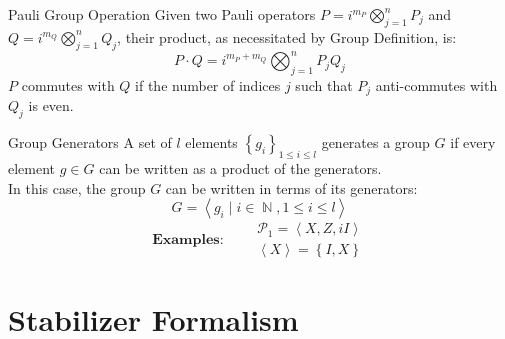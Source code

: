 \documentclass[english,aspectratio=169]{tumbeamer}
\DeclareMathOperator{\natur}{\mathbb{N}}
\begin{document}
    \begin{frame}{Pauli Group Operation}
        Given two Pauli operators
        \(P=i^{m_P}\bigotimes_{j=1}^{n}P_j\)
        and
        \(Q=i^{m_Q}\bigotimes_{j=1}^{n}Q_j\),
        their product, as necessitated by Group Definition, is:
        \[
            P\cdot Q=i^{m_P+m_Q}\bigotimes_{j=1}^{n}P_jQ_j
        \]
        \newline
        \(P\) commutes with \(Q\) if the number of indices \(j\) such that \(P_j\) anti-commutes with \(Q_j\) is even.
        \vspace*{25mm}

        {\footnotesize
        \cite*{02_ImprovedSimulationOfStabilizerCircuits}
        }
    \end{frame}

    \begin{frame}{Group Generators}
        A set of \(l\) elements \(\left\{g_i\right\}_{1\leq i\leq l}\)
        generates a group \(G\) if every element \(g\in G\) can be written as a product of the generators. \\
        In this case, the group \(G\) can be written in terms of its generators:
        \[
            G=\left\langle g_i\mid i\in\natur,1\leq i\leq l\right\rangle
        \]
        \[
            \textbf{Examples:}\qquad
            \begin{matrix}
                \mathcal{P}_1=\left\langle X,Z,iI\right\rangle \\
                \left\langle X\right\rangle = \left\{I,X\right\}
            \end{matrix}
        \]
        \vspace*{20mm}

        {\footnotesize
        \cite*{01_QuantumComputationAndQuantumInformation}
        }
    \end{frame}


    \section{Stabilizer Formalism}
    \label{sec:stabilizer-formalism}
\end{document}
